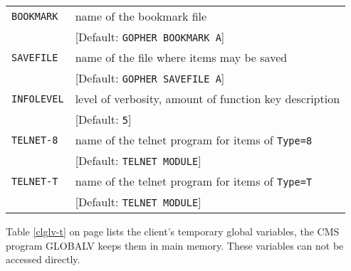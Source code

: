 \begin{table}
\begin{center}
\begin{minipage}{\textwidth}
\begin{tabular}{|l|l|}
\hline %
{\tt BOOKMARK}  & name of the bookmark file                                 \\
                & [Default: {\tt GOPHER BOOKMARK A}]                        \\
\hline %
{\tt SAVEFILE}  & name of the file where items may be saved                 \\
                & [Default: {\tt GOPHER SAVEFILE A}]                        \\
\hline %
{\tt INFOLEVEL} & level of verbosity, amount of function key description    \\
                & [Default: {\tt 5}]                                        \\
\hline %
{\tt TELNET-8}  & name of the telnet program for items of {\tt Type=8}      \\
                & [Default: {\tt TELNET MODULE}]                            \\
\hline %
{\tt TELNET-T}  & name of the telnet program for items of {\tt Type=T}      \\
                & [Default: {\tt TELNET MODULE}]                            \\
\hline %
\end{tabular}
\end{minipage}
\end{center}
\end{table}

 


 
  Table \ref{clglv-t} on page \pageref{clglv-t} lists the client's
  temporary global variables,
  the CMS program GLOBALV keeps them in main memory.
  These variables can not be accessed directly.



